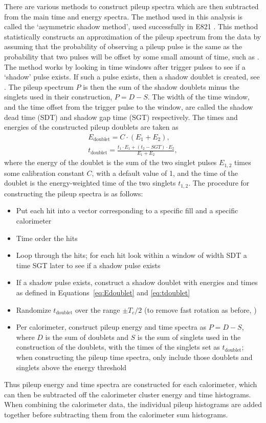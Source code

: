 There are various methods to construct pileup spectra which are then subtracted from the main time and energy spectra. The method used in this analysis is called the `asymmetric shadow method', used successfully in E821 \cite{E821PileupShadow}. This method statistically constructs an approximation of the pileup spectrum from the data by assuming that the probability of observing a pileup pulse is the same as the probability that two pulses will be offset by some small amount of time, such as . The method works by looking in time windows after trigger pulses to see if a `shadow' pulse exists. If such a pulse exists, then a shadow doublet is created, see . The pileup spectrum $P$ is then the sum of the shadow doublets minus the singlets used in their construction, $P = D - S$. The width of the time window, and the time offset from the trigger pulse to the window, are called the shadow dead time (SDT) and shadow gap time (SGT) respectively. The times and energies of the constructed pileup doublets are taken as
            \begin{gather}
                E_{\text{doublet}} = C \cdot (E_{1} + E_{2}), \label{eq:Edoublet} \\
                t_{\text{doublet}} = \frac{t_{1} \cdot E_{1} + (t_{2}-SGT) \cdot E_{2}}{E_{1} + E_{2}}, \label{eq:tdoublet}
            \end{gather}
where the energy of the doublet is the sum of the two singlet pulses $E_{1,2}$ times some calibration constant $C$, with a default value of 1, and the time of the doublet is the energy-weighted time of the two singlets $t_{1,2}$. The procedure for constructing the pileup spectra is as follows:
\begin{itemize}
    \item{Put each hit into a vector corresponding to a specific fill and a specific calorimeter}
    \item{Time order the hits}
    \item{Loop through the hits; for each hit look within a window of width SDT a time SGT later to see if a shadow pulse exists}
    \item{If a shadow pulse exists, construct a shadow doublet with energies and times as defined in Equations~\ref{eq:Edoublet} and \ref{eq:tdoublet}}
    \item{Randomize $t_{\text{doublet}}$ over the range $\pm T_{c}/2$ (to remove fast rotation as before, )}
    \item{Per calorimeter, construct pileup energy and time spectra as $P = D - S$, where $D$ is the sum of doublets and $S$ is the sum of singlets used in the construction of the doublets, with the times of the singlets set as $t_{\text{doublet}}$; when constructing the pileup time spectra, only include those doublets and singlets above the energy threshold}
\end{itemize}
Thus pileup energy and time spectra are constructed for each calorimeter, which can then be subtracted off the calorimeter cluster energy and time histograms. When combining the calorimeter data, the individual pileup histograms are added together before subtracting them from the calorimeter sum histograms.


